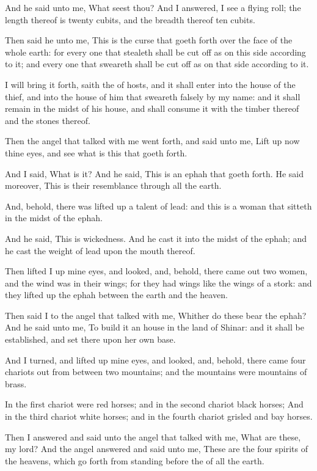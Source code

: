 \Verse And he said unto me, What seest thou? And I answered, I see a flying roll; the length thereof is twenty cubits, and the breadth thereof ten cubits.

\Verse Then said he unto me, This is the curse that goeth forth over the face of the whole earth: for every one that stealeth shall be cut off as on this side according to it; and every one that sweareth shall be cut off as on that side according to it.

\Verse I will bring it forth, saith the \LORD of hosts, and it shall enter into the house of the thief, and into the house of him that sweareth falsely by my name: and it shall remain in the midst of his house, and shall consume it with the timber thereof and the stones thereof.

\Verse Then the angel that talked with me went forth, and said unto me, Lift up now thine eyes, and see what is this that goeth forth.

\Verse And I said, What is it? And he said, This is an ephah that goeth forth. He said moreover, This is their resemblance through all the earth.

\Verse And, behold, there was lifted up a talent of lead: and this is a woman that sitteth in the midst of the ephah.

\Verse And he said, This is wickedness. And he cast it into the midst of the ephah; and he cast the weight of lead upon the mouth thereof.

\Verse Then lifted I up mine eyes, and looked, and, behold, there came out two women, and the wind was in their wings; for they had wings like the wings of a stork: and they lifted up the ephah between the earth and the heaven.

\Verse Then said I to the angel that talked with me, Whither do these bear the ephah?  \Verse And he said unto me, To build it an house in the land of Shinar: and it shall be established, and set there upon her own base.


\Chapter
\Verse And I turned, and lifted up mine eyes, and looked, and, behold, there came four chariots out from between two mountains; and the mountains were mountains of brass.

\Verse In the first chariot were red horses; and in the second chariot black horses; \Verse And in the third chariot white horses; and in the fourth chariot grisled and bay horses.

\Verse Then I answered and said unto the angel that talked with me, What are these, my lord?  \Verse And the angel answered and said unto me, These are the four spirits of the heavens, which go forth from standing before the \LORD of all the earth.

